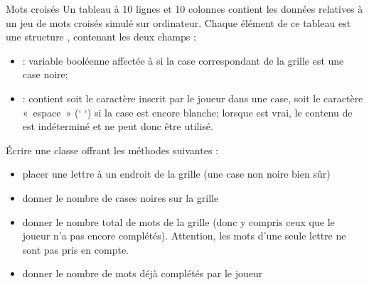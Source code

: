 \begin{Exercice}{Mots croisés}
	Un tableau  à 10 lignes et 10 colonnes contient les données
	relatives à un jeu de mots croisés simulé sur ordinateur. Chaque
	élément de ce tableau est une structure ,
	contenant les deux champs :

	\begin{itemize}
		\item 
			 : variable booléenne affectée à
			 si la case correspondant de la grille est une
			case noire;
		\item 
			 : contient soit le caractère inscrit par le
			joueur dans une case, soit le caractère «~espace~» (‘ ‘) si la case est
			encore blanche; lorsque  est vrai, le contenu
			de  est indéterminé et ne peut donc être
			utilisé. 
	\end{itemize}
	
	Écrire une classe  offrant les méthodes
	suivantes :

	\begin{itemize}
		\item 
			placer une lettre à un endroit de la grille (une case non noire bien
			sûr)
		\item 
			donner le nombre de cases noires sur la grille
		\item 
			donner le nombre total de mots de la grille (donc y compris ceux que le
			joueur n’a pas encore complétés). Attention, les mots
			d'une seule lettre ne sont pas pris en compte.
		\item 
			donner le nombre de mots déjà complétés par le joueur
	\end{itemize}


\end{Exercice}
